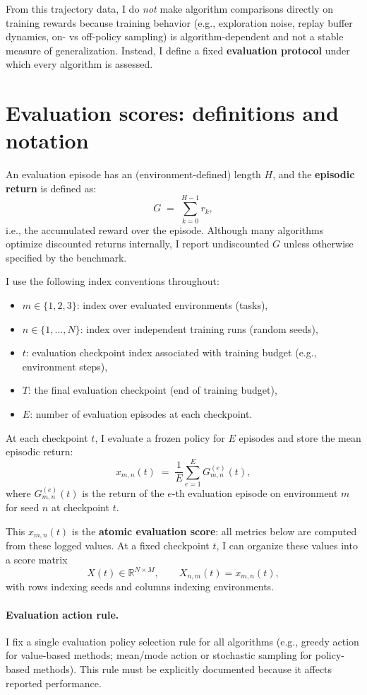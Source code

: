 From this trajectory data, I do \emph{not} make algorithm comparisons directly on training rewards
because training behavior (e.g., exploration noise, replay buffer dynamics, on- vs off-policy sampling)
is algorithm-dependent and not a stable measure of generalization. Instead, I define a fixed
\textbf{evaluation protocol} under which every algorithm is assessed.

\section{Evaluation scores: definitions and notation}

An evaluation episode has an (environment-defined) length $H$, and the \textbf{episodic return}
is defined as:
\[
G \;=\; \sum_{k=0}^{H-1} r_k,
\]
i.e., the accumulated reward over the episode. Although many algorithms optimize discounted returns
internally, I report undiscounted $G$ unless otherwise specified by the benchmark.

I use the following index conventions throughout:

\begin{itemize}
  \item $m\in\{1,2,3\}$: index over evaluated environments (tasks),
  \item $n\in\{1,\dots,N\}$: index over independent training runs (random seeds),
  \item $t$: evaluation checkpoint index associated with training budget (e.g., environment steps),
  \item $T$: the final evaluation checkpoint (end of training budget),
  \item $E$: number of evaluation episodes at each checkpoint.
\end{itemize}

At each checkpoint $t$, I evaluate a frozen policy for $E$ episodes and store the mean
episodic return:
\[
x_{m,n}(t)\;=\;\frac{1}{E}\sum_{e=1}^{E}G^{(e)}_{m,n}(t),
\]
where $G^{(e)}_{m,n}(t)$ is the return of the $e$-th evaluation episode on environment $m$
for seed $n$ at checkpoint $t$.

This $x_{m,n}(t)$ is the \textbf{atomic evaluation score}: all metrics below are computed from
these logged values. At a fixed checkpoint $t$, I can organize these values into a score matrix
\[
X(t)\in\mathbb{R}^{N\times M},\qquad X_{n,m}(t)=x_{m,n}(t),
\]
with rows indexing seeds and columns indexing environments.

\paragraph{Evaluation action rule.}
I fix a single evaluation policy selection rule for all algorithms
(e.g., greedy action for value-based methods; mean/mode action or stochastic sampling for
policy-based methods). This rule must be explicitly documented because it affects reported
performance. \cite{patterson2024edrl}

